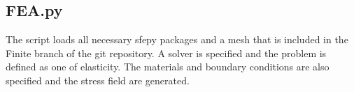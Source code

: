 \subsection{FEA.py}

The script loads all necessary sfepy packages and a mesh that is included in the Finite branch of the git repository. A solver is specified and the problem is defined as one of elasticity. The materials and boundary conditions are also specified and the stress field are generated.